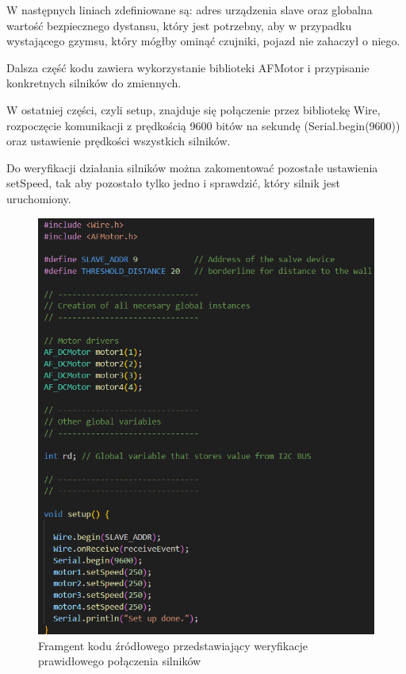 \documentclass{report}
\begin{document}
W następnych liniach zdefiniowane są: adres urządzenia slave oraz globalna wartość bezpiecznego dystansu, który jest potrzebny, aby w przypadku wystającego gzymsu, który mógłby ominąć czujniki, pojazd nie zahaczył o niego.

Dalsza część kodu zawiera wykorzystanie biblioteki AFMotor i przypisanie konkretnych silników do zmiennych.

W ostatniej części, czyli setup, znajduje się połączenie przez bibliotekę Wire, rozpoczęcie komunikacji z prędkością 9600 bitów na sekundę (Serial.begin(9600)) oraz ustawienie prędkości wszystkich silników.

Do weryfikacji działania silników można zakomentować pozostałe ustawienia setSpeed, tak aby pozostało tylko jedno i sprawdzić, który silnik jest uruchomiony.
\begin{figure}[H]
    \centering
    \includegraphics*[width=1.0\textwidth]{"src/code_snaps/eng_ste_arduino.png"}
    \caption{Framgent kodu źródłowego przedstawiający weryfikacje prawidłowego połączenia silników}
    \label{fig:eng_ste_arduino}
\end{figure}
\end{document}
